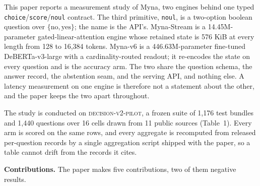 \documentclass[11pt]{article}
\begin{document}
This paper reports a measurement study of Myna, two engines behind one typed
\texttt{choice}/\texttt{score}/\texttt{noul} contract. The third primitive, \texttt{noul}, is a two-option boolean question over $\{\text{no},\text{yes}\}$; the name is the API's. Myna-Stream{} is a 14.45M-parameter
gated-linear-attention engine whose retained state is 576 KiB at every length from 128 to
16{,}384 tokens. Myna-v6{} is a 446.63M-parameter fine-tuned DeBERTa-v3-large with a
cardinality-routed readout; it re-encodes the state on every question and is the accuracy arm.
The two share the question schema, the answer record, the abstention seam, and the serving API,
and nothing else. A latency measurement on one engine is therefore not a statement about the
other, and the paper keeps the two apart throughout.

The study is conducted on \textsc{decision-v2-pilot}, a frozen suite of 1{,}176 test bundles and
1{,}440 questions over 16 cells drawn from 11 public sources (Table~1). Every arm
is scored on the same rows, and every aggregate is recomputed from released per-question records
by a single aggregation script shipped with the paper, so a table cannot drift from the records
it cites.

\textbf{Contributions.} The paper makes five contributions, two of them negative results.
\end{document}
